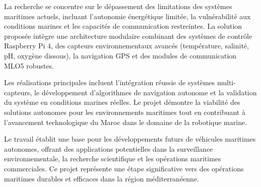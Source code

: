 La recherche se concentre sur le dépassement des limitations des systèmes maritimes actuels, incluant l'autonomie énergétique limitée, la vulnérabilité aux conditions marines et les capacités de communication restreintes. La solution proposée intègre une architecture modulaire combinant des systèmes de contrôle Raspberry Pi 4, des capteurs environnementaux avancés (température, salinité, pH, oxygène dissous), la navigation GPS et des modules de communication MLO5 robustes.

Les réalisations principales incluent l'intégration réussie de systèmes multi-capteurs, le développement d'algorithmes de navigation autonome et la validation du système en conditions marines réelles. Le projet démontre la viabilité des solutions autonomes pour les environnements maritimes tout en contribuant à l'avancement technologique du Maroc dans le domaine de la robotique marine.

Le travail établit une base pour les développements futurs de véhicules maritimes autonomes, offrant des applications potentielles dans la surveillance environnementale, la recherche scientifique et les opérations maritimes commerciales. Ce projet représente une étape significative vers des opérations maritimes durables et efficaces dans la région méditerranéenne.

\MediaOptionLogicBlank

